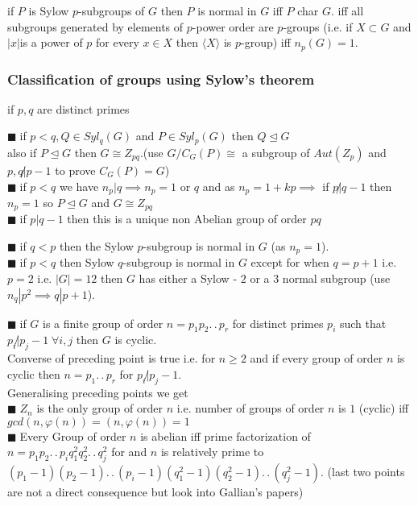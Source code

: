 \documentclass[11pt]{extarticle}
\newcommand{\ck}{.\,.\,}
\newcommand{\snote}[1]{{\footnotesize(#1)}}
\newcommand{\y}{$\blacksquare\;$}
\newcommand{\tbx}[2][]{
	\begin{tcolorbox}[enhanced,breakable,size=small,colback=black!2!white,title={#1},arc is angular, arc=1.5mm,drop fuzzy shadow]
		#2
	\end{tcolorbox}
}
\begin{document}
\begin{multicols}{2}
	\tbx[Consequences of of Sylow's Theorem ]{
		if $ P $ is Sylow $ p $-subgroups of $ G $ then $P$ is normal in $ G $ iff $ P $ char $ G .$ iff all subgroups generated by 
		elements of $ p $-power order are $ p $-groups  (i.e. if $ X\subset G $ and $ |x| $is a power of $ p $ for every 
		$ x\in X $ then $ \langle X \rangle $ is $ p $-group) iff $ n_p(G)=1. $}

	\subsubsection{ Classification of groups using Sylow's theorem}
	 if $ p,q $ are distinct primes
	\tbx[group $ G $ of order $ pq $ ]{
		
			\y   if $ p<q , Q\in Syl_q(G)$ and $ P\in Syl_p(G) $  then $ Q\trianglelefteq G $ \\ 
			also if $ P\trianglelefteq G $ then $ G\cong Z_{pq}.$(use $ G/C_G(P) \cong $ a subgroup of $ Aut(Z_p) $ and $ p,q\not| p-1 $ to prove $ C_G(P)=G $)	\\
			\y  if $ p<q $ we have $ n_p|q  \implies n_p=1 $ or $ q $  and as $ n_p=1+kp \implies $ if $ p\not| q-1 $ then $ n_p=1 $ so $ P\trianglelefteq G $ and $ G \cong Z_{pq} $  \\
			\y  if $ p|q-1 $ then this is a unique non Abelian group of order $ pq $ }
		
	
	\tbx[group $ G $ of order $ p^2q $]{
			\y  if $ q<p$ then the Sylow $ p $-subgroup is normal in $ G $ (as $ n_p=1 $). \\
			\y  if $ p<q $ then Sylow $ q $-subgroup is normal in $ G $ except for when $ q=p+1 $ i.e. $ p=2 $ i.e. $ |G|=12 $ then $ G $ has either a Sylow - $ 2 $ or a $ 3 $ normal subgroup (use $ n_q|p^2 \implies q|p+1 $). }
	\tbx{ \y if  $ G $ is a finite group of order $ n=p_1p_2\ck p_r $ for distinct primes $ p_i $ such that $ p_i\not| p_j-1\; \forall i,j $  then $ G $ is cyclic. \\
	Converse of preceding point is true i.e. for $ n\geq 2 $ and  if every group of order $ n $ is cyclic then $ n=p_1\ck p_r $  for $ p_i \not| p_j-1. $\\
		Generalising preceding points we get\\
	\y $ Z_n $ is the only group of order $ n $ i.e. number  of groups of order $ n $ is $ 1 $ (cyclic) iff 
	$ gcd(n,\varphi(n))=(n,\varphi(n))=1 $ \\
	\y Every Group of order $ n $ is abelian iff  prime factorization of $ n=p_1p_2\ck p_i q_1^2q_2^2\ck q_j^2 $ for and $ n $ is relatively prime to $ (p_1-1)(p_2-1)\ck (p_i-1) (q_1^2-1)(q_2^2-1)\ck (q_j^2-1).$ 
	\snote{last two points are not a direct consequence but look into Gallian's papers}  }
	 

\end{multicols}
\end{document}
